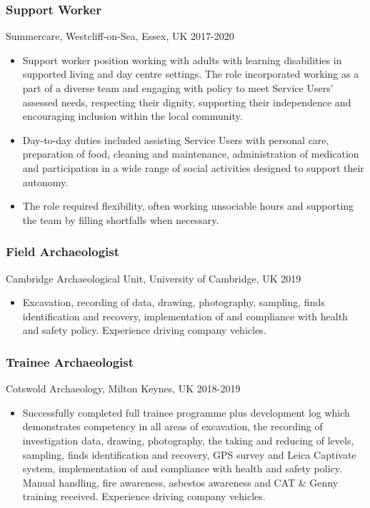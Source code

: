 \documentclass[11pt,a4paper]{article}
\providecommand{\tightlist}{%
  \setlength{\itemsep}{0pt}\setlength{\parskip}{0pt}}
\begin{document}
\subsubsection{Support Worker}\label{support-worker}

Summercare, Westcliff-on-Sea, Essex, UK 2017-2020

\begin{itemize}
\tightlist
\item
  Support worker position working with adults with learning disabilities
  in supported living and day centre settings. The role incorporated
  working as a part of a diverse team and engaging with policy to meet
  Service Users' assessed needs, respecting their dignity, supporting
  their independence and encouraging inclusion within the local
  community.
\item
  Day-to-day duties included assisting Service Users with personal care,
  preparation of food, cleaning and maintenance, administration of
  medication and participation in a wide range of social activities
  designed to support their autonomy.
\item
  The role required flexibility, often working unsociable hours and
  supporting the team by filling shortfalls when necessary.
\end{itemize}

\subsubsection{Field Archaeologist}\label{field-archaeologist}

Cambridge Archaeological Unit, University of Cambridge, UK 2019

\begin{itemize}
\tightlist
\item
  Excavation, recording of data, drawing, photography, sampling, finds
  identification and recovery, implementation of and compliance with
  health and safety policy. Experience driving company vehicles.
\end{itemize}

\subsubsection{Trainee Archaeologist}\label{trainee-archaeologist}

Cotswold Archaeology, Milton Keynes, UK 2018-2019

\begin{itemize}
\tightlist
\item
  Successfully completed full trainee programme plus development log
  which demonstrates competency in all areas of excavation, the
  recording of investigation data, drawing, photography, the taking and
  reducing of levels, sampling, finds identification and recovery, GPS
  survey and Leica Captivate system, implementation of and compliance
  with health and safety policy. Manual handling, fire awareness,
  asbestos awareness and CAT \& Genny training received. Experience
  driving company vehicles.
\end{itemize}
\end{document}
